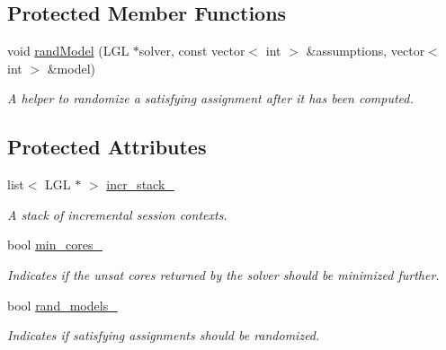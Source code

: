 \subsection*{Protected Member Functions}
\begin{DoxyCompactItemize}
\item 
void \hyperlink{classLingelingApi_a1b2cec409be65f2bf885593c83d73883}{rand\-Model} (L\-G\-L $\ast$solver, const vector$<$ int $>$ \&assumptions, vector$<$ int $>$ \&model)
\begin{DoxyCompactList}\small\item\em A helper to randomize a satisfying assignment after it has been computed. \end{DoxyCompactList}\end{DoxyCompactItemize}
\subsection*{Protected Attributes}
\begin{DoxyCompactItemize}
\item 
list$<$ L\-G\-L $\ast$ $>$ \hyperlink{classLingelingApi_af9b5703f6611337668def5aaf6be465a}{incr\-\_\-stack\-\_\-}
\begin{DoxyCompactList}\small\item\em A stack of incremental session contexts. \end{DoxyCompactList}\item 
bool \hyperlink{classSatSolver_adfeecebfd09606c82b5c57cfe5aad813}{min\-\_\-cores\-\_\-}
\begin{DoxyCompactList}\small\item\em Indicates if the unsat cores returned by the solver should be minimized further. \end{DoxyCompactList}\item 
bool \hyperlink{classSatSolver_a73fed24d8fb4da85ef82dc53ac5f28c7}{rand\-\_\-models\-\_\-}
\begin{DoxyCompactList}\small\item\em Indicates if satisfying assignments should be randomized. \end{DoxyCompactList}\end{DoxyCompactItemize}
